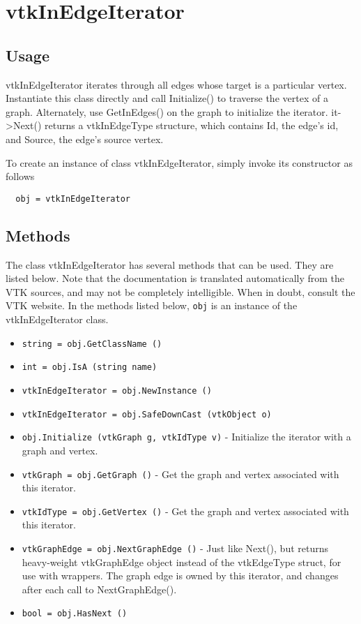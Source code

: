 \section{vtkInEdgeIterator}

\subsection{Usage}

 vtkInEdgeIterator iterates through all edges whose target is a particular
 vertex. Instantiate this class directly and call Initialize() to traverse
 the vertex of a graph. Alternately, use GetInEdges() on the graph to
 initialize the iterator. it->Next() returns a vtkInEdgeType structure,
 which contains Id, the edge's id, and Source, the edge's source vertex.


To create an instance of class vtkInEdgeIterator, simply
invoke its constructor as follows
\begin{verbatim}
  obj = vtkInEdgeIterator
\end{verbatim}
\subsection{Methods}

The class vtkInEdgeIterator has several methods that can be used.
  They are listed below.
Note that the documentation is translated automatically from the VTK sources,
and may not be completely intelligible.  When in doubt, consult the VTK website.
In the methods listed below, \verb|obj| is an instance of the vtkInEdgeIterator class.
\begin{itemize}
\item  \verb|string = obj.GetClassName ()|

\item  \verb|int = obj.IsA (string name)|

\item  \verb|vtkInEdgeIterator = obj.NewInstance ()|

\item  \verb|vtkInEdgeIterator = obj.SafeDownCast (vtkObject o)|

\item  \verb|obj.Initialize (vtkGraph g, vtkIdType v)| -  Initialize the iterator with a graph and vertex.

\item  \verb|vtkGraph = obj.GetGraph ()| -  Get the graph and vertex associated with this iterator.

\item  \verb|vtkIdType = obj.GetVertex ()| -  Get the graph and vertex associated with this iterator.

\item  \verb|vtkGraphEdge = obj.NextGraphEdge ()| -  Just like Next(), but
 returns heavy-weight vtkGraphEdge object instead of
 the vtkEdgeType struct, for use with wrappers.
 The graph edge is owned by this iterator, and changes
 after each call to NextGraphEdge().

\item  \verb|bool = obj.HasNext ()|

\end{itemize}
